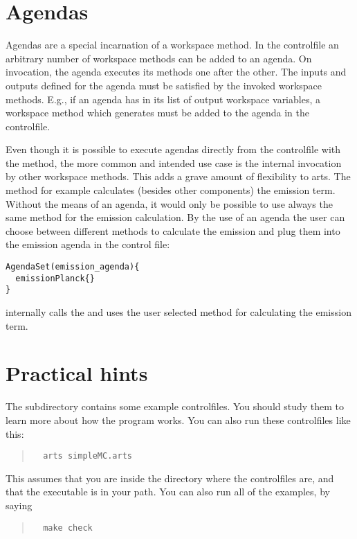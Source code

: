 \section{Agendas}
\label{sec:concept:agendas}

Agendas are a special incarnation of a workspace method. In the
controlfile an arbitrary number of workspace methods can be added to
an agenda. On invocation, the agenda executes its methods one
after the other. The inputs and outputs defined for the agenda must
be satisfied by the invoked workspace methods. E.g., if an agenda
has  in its list of output workspace variables, a
workspace method which generates  must be added to
the agenda in the controlfile.

Even though it is possible to execute agendas directly from the
controlfile with the  method, the more common
and intended use case is the internal invocation by other workspace
methods. This adds a grave amount of flexibility to arts. The
 method for example calculates (besides other
components) the emission term. Without the means of an agenda, it
would only be possible to use always the same method for the emission
calculation. By the use of an agenda the user can choose between
different methods to calculate the emission and plug them into the
emission agenda in the control file:

{\small
\begin{verbatim}
AgendaSet(emission_agenda){
  emissionPlanck{}
}
\end{verbatim}
}

\noindent
{} internally calls the  and
uses the user selected method for calculating the emission term.



\section{Practical hints}
\label{sec:concept:practical}

The subdirectory  contains some example controlfiles.
You should study them to learn more about how the program works. You
can also run these controlfiles like this:
\begin{quote}
\begin{verbatim}
  arts simpleMC.arts
\end{verbatim}
\end{quote}
This assumes that you are inside the directory where the controlfiles
are, and that the  executable is in your path.  You can
also run all of the examples, by saying
\begin{quote}
\begin{verbatim}
  make check
\end{verbatim}
\end{quote}

